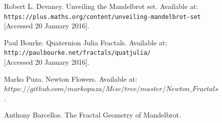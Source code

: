 \documentclass[12pt]{article}
\begin{document}
\begin{thebibliography}{9}
\bibitem{}Robert L. Devaney. Unveiling the Mandelbrot set. Available at: \texttt{https://plus.maths.org/content/unveiling-mandelbrot-set\\} [Accessed 20 January 2016].

\bibitem{}Paul Bourke. Quaternion Julia Fractals. Available at: \texttt{http://paulbourke.net/fractals/quatjulia/\\} [Accessed 20 January 2016].

\bibitem{}Marko Puza. Newton Flowers. Available at: \\ \texttt{$https://github.com/markopuza/Misc/tree/master/Newton\_Fractals$\\}.

\bibitem{}Anthony Barcellos. The Fractal Geometry of Mandelbrot.

\end{thebibliography}
\end{document}
